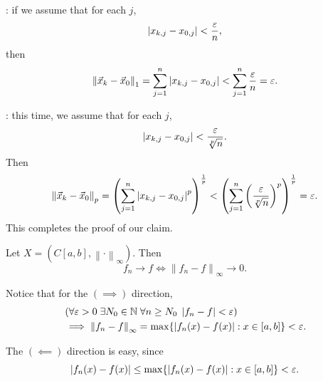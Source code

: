 \documentclass[notoc,notitlepage]{tufte-book}
\newcommand{\norm}[1]{\left\| #1 \right\|}
\begin{document}
\begin{eg}
  \noindent{} : if we assume that for each $j$,
  \begin{equation*}
    \left| x_{k, j} - x_{0, j} \right| < \frac{\varepsilon}{n},
  \end{equation*}
  then
  \begin{equation*}
    \norm{\vec{x}_k - \vec{x}_0}_1 = \sum_{j=1}^{n} \abs{ x_{k, j} - x_{0, j} } < \sum_{j=1}^{n} \frac{\epsilon}{n} = \epsilon.
  \end{equation*}

  \noindent{} : this time, we assume that for each $j$,
  \begin{equation*}
    \left| x_{k, j} - x_{0, j} \right| < \frac{\varepsilon}{\sqrt[p]{n}}.
  \end{equation*}
  Then
  \begin{equation*}
    \norm{ \vec{x}_k - \vec{x}_0 }_p = {\left( \sum_{j=1}^{n} {\abs{ x_{k, j} - x_{0, j} }}^p \right)}^{\frac{1}{p}} < {\left( \sum_{j=1}^{n} {\left( \frac{\epsilon}{\sqrt[p]{n}} \right)}^p \right)}^{\frac{1}{p}} = \epsilon.
  \end{equation*}
  This completes the proof of our claim.
\end{eg}

\begin{eg}
  Let $X = ( C[a, b], \norm\cdot_\infty )$. Then
  \begin{equation*}
    f_n \to f \iff \norm{ f_n - f }_\infty \to 0.
  \end{equation*}

  \noindent Notice that for the $(\implies)$ direction,
  \begin{align*}
    &\left( \forall \epsilon > 0 \; \exists N_0 \in \mathbb{N} \; \forall n \geq N_0 \; \abs{ f_n - f } < \epsilon \right) \\
    &\implies \norm{ f_n - f }_\infty = \max \{ \abs{ f_n(x) - f(x) } : x \in [a, b] \} < \epsilon.
  \end{align*}

  The $(\impliedby)$ direction is easy, since
  \begin{equation*}
    \left| f_n(x) - f(x) \right| \leq \max \{ \left| f_n(x) - f(x) \right| : x \in [a, b] \} < \varepsilon.
  \end{equation*}
\end{eg}
\end{document}

